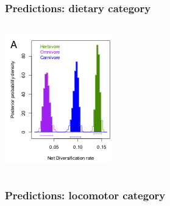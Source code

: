 \documentclass{beamer} \usepackage{amsmath,amsthm}
\begin{document}
\begin{frame}
  \frametitle{Predictions: dietary category}
  \begin{columns}
    \begin{column}{0.5\textwidth}
      \includegraphics[height=0.4\textheight, width=\textwidth, keepaspectratio=true]{figure/dietdiv}
    \end{column}
    \begin{column}{0.5\textwidth}
    \end{column}
  \end{columns}
\end{frame}

\begin{frame}
  \frametitle{Predictions: locomotor category}
\end{frame}
\end{document}
